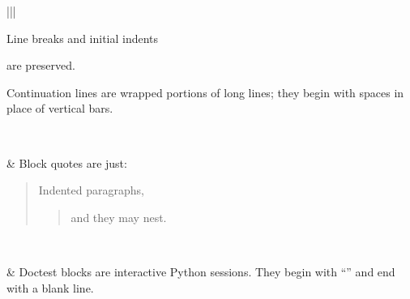 \documentclass[letterpaper,10pt,english]{sphinxmanual}
\begin{document}
\begin{savenotes}
\begin{tabular}[t]{|*{2}{|}}
\begin{DUlineblock}{0em}
\begin{DUlineblock}{\DUlineblockindent}
\item[] Line breaks and initial indents
\item[] are preserved.
\end{DUlineblock}
\item[] Continuation lines are wrapped
portions of long lines; they begin
with spaces in place of vertical bars.
\end{DUlineblock}
\\
\hline
\begin{sphinxVerbatimintable}[commandchars=\\\{\}]
   

     

           
\end{sphinxVerbatimintable}
&
Block quotes are just:
\begin{quote}

Indented paragraphs,
\begin{quote}

and they may nest.
\end{quote}
\end{quote}
\\
\hline
\begin{sphinxVerbatimintable}[commandchars=\\\{\}]
   
    
      

  
    
\end{sphinxVerbatimintable}
&
Doctest blocks are interactive
Python sessions. They begin with
“\sphinxcode{\sphinxupquote{>>>}}” and end with a blank line.

\begin{sphinxVerbatimintable}[commandchars=\\\{\}]
 
\end{sphinxVerbatimintable}
\\
\hline
\begin{sphinxVerbatimintable}[commandchars=\\\{\}]
      
     


\end{sphinxVerbatimintable}
\end{tabular}
\end{savenotes}
\end{document}
